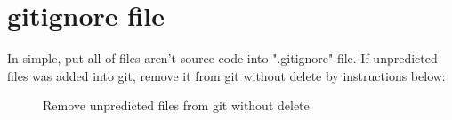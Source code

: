 \section{gitignore file}

\begin{crules}
\end{crules}

In simple, put all of files aren't source code into ".gitignore" file.
If unpredicted files was added into git, remove it from git without delete
by instructions below:

\begin{figure}[h]
    \caption{Remove unpredicted files from git without delete}
    
\end{figure}
